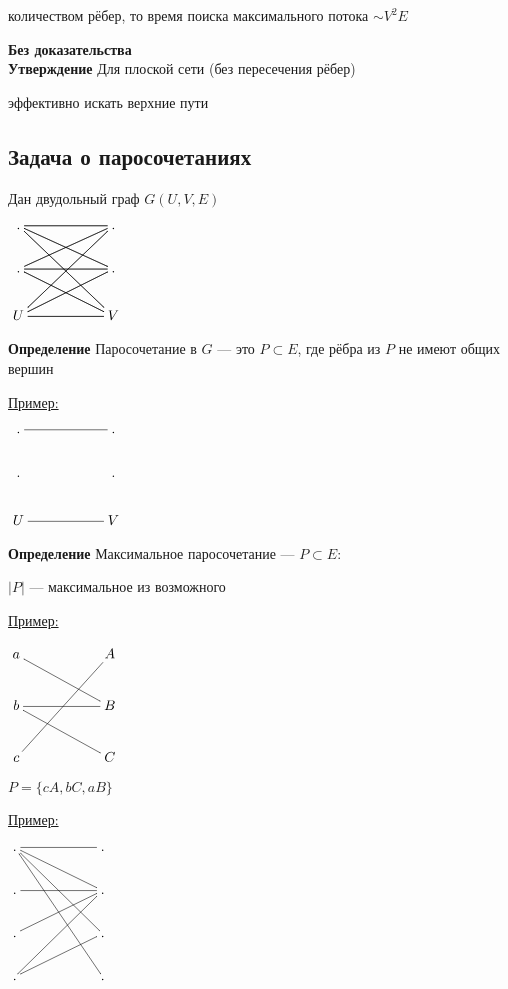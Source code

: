 \documentclass[a4paper, 12pt] {article}
\begin{document}
 количеством рёбер, то время поиска максимального потока $ \sim V^{2}E$

\textbf{Без доказательства}\\

\textbf{Утверждение} Для плоской сети (без пересечения рёбер)

эффективно искать верхние пути\\

\subsection{Задача о паросочетаниях}

Дан двудольный граф $ G(U, V, E) $

$\xymatrix{
	. \ar@{-}[rr] \ar@{-}[rrd] \ar@{-}[rrdd] & & . \ar@{-}[ll] \ar@{-}[lld] \ar@{-}[lldd]\\
	. \ar@{-}[rr] \ar@{-}[rrd] \ar@{-}[rru] & & . \ar@{-}[ll] \ar@{-}[lld] \ar@{-}[llu]\\
	U \ar@{-}[rr] \ar@{-}[rru] \ar@{-}[rruu] & & V \ar@{-}[ll] \ar@{-}[llu] \ar@{-}[lluu]\\
}$

\textbf{Определение} Паросочетание в $ G $ --- это $ P \subset E $, где рёбра из $ P $ не имеют общих вершин

\underline{Пример:}

$\xymatrix{
	. \ar@{-}[rr] & & . \\
	.    & & . \\
	U \ar@{-}[rr] & & V \\
}$

\textbf{Определение} Максимальное паросочетание ---  $ P \subset E :$ 

 $ |P|$ --- максимальное из возможного 
 
\underline{ Пример:}
 
 $\xymatrix{
 	a \ar@{-}[rrd]  & & A \\
 	b  \ar@{-}[rr] \ar@{-}[rrd]  & & B \\
 	c \ar@{-}[rruu] & & C \\
 }$

 $ P = \{cA, bC, aB\} $
 
 \newpage
 
 \underline{ Пример:}
 
 $\xymatrix{
 	. \ar@{-}[rrddd] \ar@{-}[rr] \ar@{-}[rrd] \ar@{-}[rrdd] & & . \\
 	.   \ar@{-}[rr] & & . \\
 	.  \ar@{-}[rru]  & &  . \\
 	.  \ar@{-}[rru] \ar@{-}[rruu] & &  . \\
 }$
\end{document}
